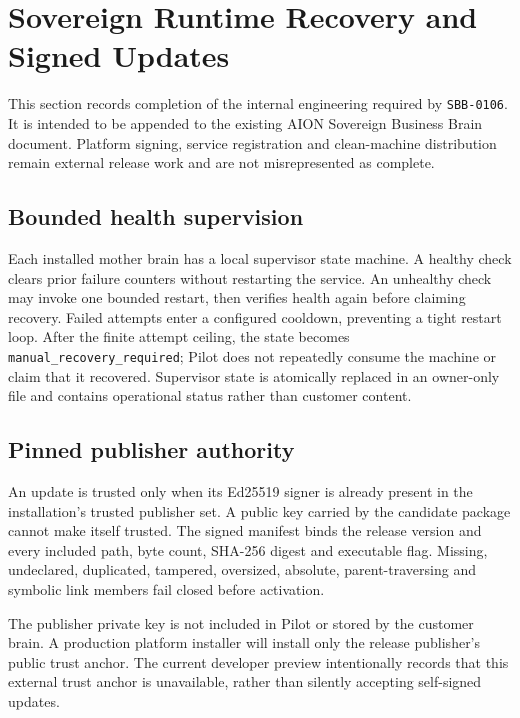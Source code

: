 \section{Sovereign Runtime Recovery and Signed Updates}
\label{sec:sovereign-runtime-recovery-updates}

This section records completion of the internal engineering required by \texttt{SBB-0106}. It is
intended to be appended to the existing AION Sovereign Business Brain document. Platform signing,
service registration and clean-machine distribution remain external release work and are not
misrepresented as complete.

\subsection{Bounded health supervision}

Each installed mother brain has a local supervisor state machine. A healthy check clears prior
failure counters without restarting the service. An unhealthy check may invoke one bounded restart,
then verifies health again before claiming recovery. Failed attempts enter a configured cooldown,
preventing a tight restart loop. After the finite attempt ceiling, the state becomes
\texttt{manual\_recovery\_required}; Pilot does not repeatedly consume the machine or claim that it
recovered. Supervisor state is atomically replaced in an owner-only file and contains operational
status rather than customer content.

\subsection{Pinned publisher authority}

An update is trusted only when its Ed25519 signer is already present in the installation's trusted
publisher set. A public key carried by the candidate package cannot make itself trusted. The signed
manifest binds the release version and every included path, byte count, SHA-256 digest and executable
flag. Missing, undeclared, duplicated, tampered, oversized, absolute, parent-traversing and symbolic
link members fail closed before activation.

The publisher private key is not included in Pilot or stored by the customer brain. A production
platform installer will install only the release publisher's public trust anchor. The current
developer preview intentionally records that this external trust anchor is unavailable, rather than
silently accepting self-signed updates.

